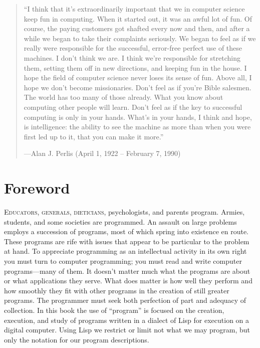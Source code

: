 \begin{quote}
``I think that it's extraordinarily important that we in computer science keep
fun in computing.  When it started out, it was an awful lot of fun.  Of course,
the paying customers got shafted every now and then, and after a while we began
to take their complaints seriously.  We began to feel as if we really were
responsible for the successful, error-free perfect use of these machines.  I
don't think we are.  I think we're responsible for stretching them, setting
them off in new directions, and keeping fun in the house.  I hope the field of
computer science never loses its sense of fun.  Above all, I hope we don't
become missionaries.  Don't feel as if you're Bible salesmen.  The world has
too many of those already.  What you know about computing other people will
learn.  Don't feel as if the key to successful computing is only in your hands.
What's in your hands, I think and hope, is intelligence: the ability to see the
machine as more than when you were first led up to it, that you can make it
more.''

\enlargethispage{\baselineskip}

\noindent
---Alan J. Perlis (April 1, 1922 -- February 7, 1990)
\end{quote}

\chapter*{Foreword}
\label{Foreword}


\lettrine{E}{ducators, generals, dieticians}, psychologists, and parents program.  Ar\-mies,
students, and some societies are programmed.  An assault on large problems
employs a succession of programs, most of which spring into existence en route.
These programs are rife with issues that appear to be particular to the problem
at hand.  To appreciate programming as an intellectual activity in its own
right you must turn to computer programming; you must read and write computer
programs---many of them.  It doesn't matter much what the programs are about or
what applications they serve.  What does matter is how well they perform and
how smoothly they fit with other programs in the creation of still greater
programs.  The programmer must seek both perfection of part and adequacy of
collection.  In this book the use of ``program'' is focused on the creation,
execution, and study of programs written in a dialect of Lisp for execution on
a digital computer.  Using Lisp we restrict or limit not what we may program,
but only the notation for our program descriptions.

